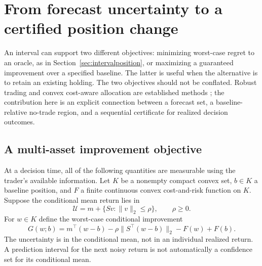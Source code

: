 \section{From forecast uncertainty to a certified position change}
\label{sec:certifiedposition}

An interval can support two different objectives: minimizing worst-case
regret to an oracle, as in Section~\ref{sec:intervalposition}, or maximizing
a guaranteed improvement over a specified baseline. The latter is useful
when the alternative is to retain an existing holding. The two objectives
should not be conflated. Robust trading and convex cost-aware allocation
are established methods \citep{BoydEtAl2017}; the contribution here is an
explicit connection between a forecast set, a baseline-relative no-trade
region, and a sequential certificate for realized decision outcomes.

\subsection{A multi-asset improvement objective}

At a decision time, all of the following quantities are measurable using
the trader's available information. Let $K$ be a nonempty compact convex
set, $b\in K$ a baseline position, and $F$ a finite continuous convex
cost-and-risk function on $K$. Suppose the conditional mean return lies in
\[
 \mathcal U=m+\{Sv:\|v\|_2\le\rho\},\qquad \rho\ge0.
\]
For $w\in K$ define the worst-case conditional improvement
\begin{equation}\label{eq:robustpositiongain}
 G(w;b)=m^\top(w-b)-\rho\|S^\top(w-b)\|_2-F(w)+F(b).
\end{equation}
The uncertainty is in the conditional mean, not in an individual realized
return. A prediction interval for the next noisy return is not automatically
a confidence set for its conditional mean.

